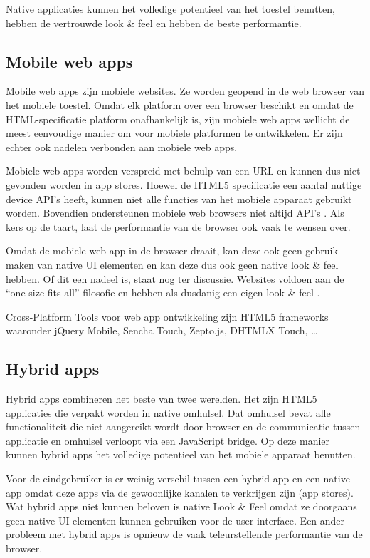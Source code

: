 \documentclass[a4paper]{IEEEconf}
\begin{document}
Native applicaties kunnen het volledige potentieel van het toestel benutten, hebben de vertrouwde look \& feel en hebben de beste performantie. 

\subsection{Mobile web apps}

Mobile web apps zijn mobiele websites. Ze worden geopend in de web browser van het mobiele toestel. Omdat elk platform over een browser beschikt en omdat de HTML-specificatie platform onafhankelijk is, zijn mobiele web apps wellicht de meest eenvoudige manier om voor mobiele platformen te ontwikkelen. Er zijn echter ook nadelen verbonden aan mobiele web apps.

Mobiele web apps worden verspreid met behulp van een URL en kunnen dus niet gevonden worden in app stores. Hoewel de HTML5 specificatie een aantal nuttige device API's heeft, kunnen niet alle functies van het mobiele apparaat gebruikt worden. Bovendien ondersteunen mobiele web browsers niet altijd API's \cite{Firtman:2012}. Als kers op de taart, laat de performantie van de browser ook vaak te wensen over.

Omdat de mobiele web app in de browser draait, kan deze ook geen gebruik maken van native UI elementen en kan deze dus ook geen native look \& feel hebben. Of dit een nadeel is, staat nog ter discussie. Websites voldoen aan de ``one size fits all'' filosofie en hebben als dusdanig een eigen look \& feel \cite{Mahemoff:2011}.

Cross-Platform Tools voor web app ontwikkeling zijn HTML5 frameworks waaronder jQuery Mobile, Sencha Touch, Zepto.js, DHTMLX Touch, \ldots

\subsection{Hybrid apps}

Hybrid apps combineren het beste van twee werelden. Het zijn HTML5 applicaties die verpakt worden in native omhulsel. Dat omhulsel bevat alle functionaliteit die niet aangereikt wordt door browser en de communicatie tussen applicatie en omhulsel verloopt via een JavaScript bridge. Op deze manier kunnen hybrid apps het volledige potentieel van het mobiele apparaat benutten.

Voor de eindgebruiker is er weinig verschil tussen een hybrid app en een native app omdat deze apps via de gewoonlijke kanalen te verkrijgen zijn (app stores). Wat hybrid apps niet kunnen beloven is native Look \& Feel omdat ze doorgaans geen native UI elementen kunnen gebruiken voor de user interface. Een ander probleem met hybrid apps is opnieuw de vaak teleurstellende performantie van de browser. 
\end{document}
